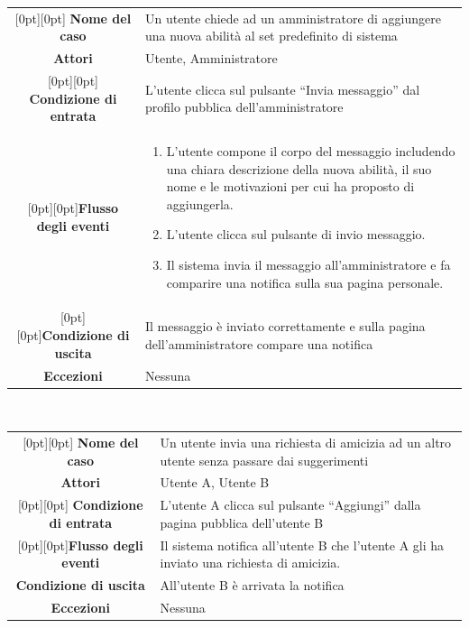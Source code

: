 \documentclass[a4paper,12pt]{article}
\begin{document}
\begin{tabularx}{\textwidth}{|c|X|}
\rowcolor[gray]{.9}\hline \raisebox{-1ex}[0pt][0pt]{ \textbf{Nome del caso}} & Un utente chiede ad un amministratore di aggiungere una nuova abilità al set predefinito di sistema \\
\rowcolor[gray]{.9}\hline  \textbf{Attori} & Utente, Amministratore \\ 
\rowcolor[gray]{.9}\hline \raisebox{-1ex}[0pt][0pt]{ \textbf{Condizione di entrata}} & L'utente clicca sul pulsante “Invia messaggio” dal profilo pubblica dell'amministratore \\
\rowcolor[gray]{.9}\hline  \raisebox{-10ex}[0pt][0pt]{\textbf{Flusso degli eventi}} & 
\begin{enumerate}
\itemsep0em
\item L'utente compone il corpo del messaggio includendo una chiara descrizione della nuova abilità, il suo nome e le motivazioni per cui ha proposto di aggiungerla.
\item L'utente clicca sul pulsante di invio messaggio.
\item Il sistema invia il messaggio all'amministratore e fa comparire una notifica sulla sua pagina personale.
\end{enumerate}
 \\ 
\rowcolor[gray]{.9}\hline  \raisebox{-1ex}[0pt][0pt]{\textbf{Condizione di uscita}} & Il messaggio è inviato correttamente e sulla pagina dell'amministratore compare una notifica \\
\rowcolor[gray]{.9}\hline  \textbf{Eccezioni} & Nessuna
\\
\hline 
\end{tabularx} \\[1\baselineskip]
\begin{tabularx}{\textwidth}{|c|X|}
\rowcolor[gray]{.9}\hline \raisebox{-1ex}[0pt][0pt]{ \textbf{Nome del caso}} & Un utente invia una richiesta di amicizia ad un altro utente senza passare dai suggerimenti \\
\rowcolor[gray]{.9}\hline  \textbf{Attori} & Utente A, Utente B \\ 
\rowcolor[gray]{.9}\hline \raisebox{-1ex}[0pt][0pt]{ \textbf{Condizione di entrata}} & L'utente A clicca sul pulsante “Aggiungi” dalla pagina pubblica dell'utente B \\
\rowcolor[gray]{.9}\hline  \raisebox{-1ex}[0pt][0pt]{\textbf{Flusso degli eventi}} & Il sistema notifica all'utente B che l'utente A gli ha inviato una richiesta di amicizia.
 \\ 
\rowcolor[gray]{.9}\hline  \textbf{Condizione di uscita} & All'utente B è arrivata la notifica \\
\rowcolor[gray]{.9}\hline  \textbf{Eccezioni} & Nessuna
\\
\hline 
\end{tabularx} \\[1\baselineskip]
\end{document}
